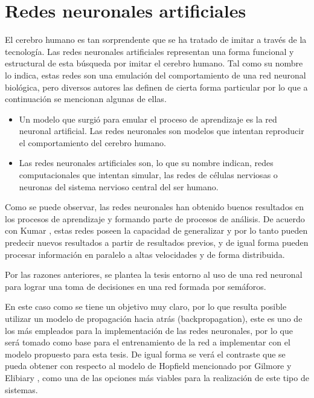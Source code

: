 \section{Redes neuronales artificiales}
		
		
		El cerebro humano es tan sorprendente que se ha tratado de imitar a trav\'{e}s de
	la tecnolog\'{i}a. Las redes neuronales artificiales representan una forma
	funcional y estructural de esta b\'{u}squeda por imitar el cerebro humano. Tal como
	su nombre lo indica, estas redes son una emulaci\'{o}n del comportamiento de una red neuronal biol\'{o}gica, pero diversos autores las definen de cierta forma particular por lo que a continuaci\'{o}n se mencionan algunas de ellas.
	
	\begin{itemize}
	  \item Un modelo que surgi\'{o} para emular el proceso de aprendizaje es la red
	  neuronal artificial. Las redes neuronales son modelos que intentan reproducir
	  el comportamiento del cerebro humano. \cite{Hilera1995}
	  \item Las redes neuronales artificiales son, lo que su nombre indican,
	  redes computacionales que intentan simular, las redes de c\'{e}lulas nerviosas o
	  neuronas del sistema nervioso central del ser humano. \cite{Graupe2007}
	\end{itemize}
	
		Como se puede observar, las redes neuronales han obtenido buenos resultados en
	los procesos de aprendizaje y formando parte de procesos de an\'{a}lisis. De
	acuerdo con Kumar \cite{Kumar2007}, estas redes poseen la capacidad de
	generalizar y por lo tanto pueden predecir nuevos resultados a partir de resultados previos, y de igual forma pueden procesar informaci\'{o}n en paralelo a altas velocidades y de forma distribuida.
	
		Por las razones anteriores, se plantea la tesis entorno al uso de una red
	neuronal para lograr una toma de decisiones en una red formada por sem\'{a}foros.
	
		En este caso como se tiene un objetivo muy claro, por lo que resulta posible
	utilizar un modelo de propagaci\'{o}n hacia atr\'{a}s (backpropagation), este es uno
	de los m\'{a}s empleados para la implementaci\'{o}n de las redes neuronales, por lo
	que ser\'{a} tomado como base para el entrenamiento de la red a implementar con
	el modelo propuesto para esta tesis. De igual forma se ver\'{a} el contraste
	que se pueda obtener con respecto al modelo de Hopfield mencionado por Gilmore
	y Elibiary \cite{Gilmore1993}, como una de las opciones m\'{a}s viables para la
	realizaci\'{o}n de este tipo de sistemas.

